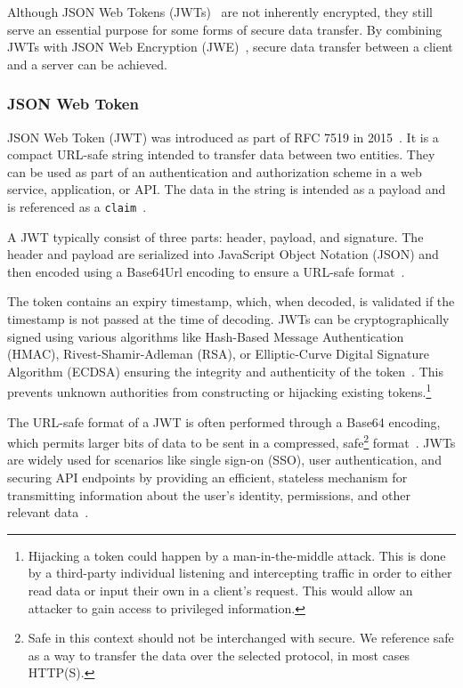 Although JSON Web Tokens (JWTs)~\cite{RFC7519} are not inherently encrypted,
they still serve an essential purpose for some forms of secure data transfer.
By combining JWTs with JSON Web Encryption (JWE)~\cite{rfc7516}, secure data
transfer between a client and a server can be achieved.

\subsubsection{JSON Web Token}
JSON Web Token (JWT) was introduced as part of RFC 7519 in 2015~\cite{RFC7519}.
It is a compact URL-safe string intended to transfer data between two entities.
They can be used as part of an authentication and authorization scheme in a web
service, application, or API\@.
The data in the string is intended as a payload and is referenced as a
\texttt{claim}~\cite{RFC7519}.

A JWT typically consist of three parts: header, payload, and signature.
The header and payload are serialized into JavaScript Object Notation (JSON)
and then encoded using a Base64Url encoding to ensure a URL-safe
format~\cite{RFC7519}.

The token contains an expiry timestamp, which, when decoded, is validated if
the timestamp is not passed at the time of decoding.
JWTs can be cryptographically signed using various algorithms like Hash-Based
Message Authentication (HMAC), Rivest-Shamir-Adleman (RSA), or
Elliptic-Curve Digital Signature Algorithm (ECDSA) ensuring the integrity and
authenticity of the token~\cite{RFC7519}.
This prevents unknown authorities from constructing or hijacking existing
tokens.\footnote{
  Hijacking a token could happen by a man-in-the-middle attack.
  This is done by a third-party individual listening and intercepting traffic
  in order to either read data or input their own in a client's request.
  This would allow an attacker to gain access to privileged information.
}

The URL-safe format of a JWT is often performed through a Base64 encoding, which
permits larger bits of data to be sent in a compressed, safe\footnote{
  Safe in this context should not be interchanged with secure.
  We reference safe as a way to transfer the data over the selected protocol,
  in most cases HTTP(S).
} format~\cite{RFC7519}.
JWTs are widely used for scenarios like single sign-on (SSO), user
authentication, and securing API endpoints by providing an efficient, stateless
mechanism for transmitting information about the user's identity, permissions,
and other relevant data~\cite{karande2018securingnode}.

